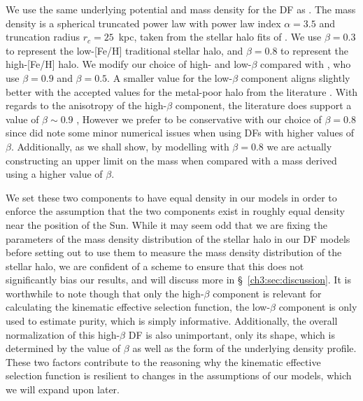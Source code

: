We use the same underlying potential \parencite[\texttt{MWPotential2014 of }][]{bovy15} and mass density for the DF as \cite{lane22}. The mass density is a spherical truncated power law with power law index $\alpha=3.5$ and truncation radius $r_{c} = 25$~kpc, taken from the stellar halo fits of \cite{mackereth20}. We use $\beta=0.3$ to represent the low-[Fe/H] traditional stellar halo, and $\beta=0.8$ to represent the high-[Fe/H] \gse halo. We modify our choice of high- and low-$\beta$ compared with \cite{lane22}, who use $\beta=0.9$ and $\beta=0.5$. A smaller value for the low-$\beta$ component aligns slightly better with the accepted values for the metal-poor halo from the literature \parencite{belokurov18,fattahi19,lancaster19,iorio21}. With regards to the anisotropy of the high-$\beta$ component, the literature does support a value of $\beta \sim 0.9$ \parencite{belokurov18,fattahi19,lancaster19,iorio21}, However we prefer to be conservative with our choice of $\beta=0.8$ since \cite{lane22} did note some minor numerical issues when using DFs with higher values of $\beta$. Additionally, as we shall show, by modelling \gse with $\beta=0.8$ we are actually constructing an upper limit on the mass when compared with a mass derived using a higher value of $\beta$.

 We set these two components to have equal density in our models in order to enforce the assumption that the two components exist in roughly equal density near the position of the Sun. While it may seem odd that we are fixing the parameters of the mass density distribution of the stellar halo in our DF models before setting out to use them to measure the mass density distribution of the stellar halo, we are confident of a scheme to ensure that this does not significantly bias our results, and will discuss more in \S~\ref{ch3:sec:discussion}. It is worthwhile to note though that only the high-$\beta$ component is relevant for calculating the kinematic effective selection function, the low-$\beta$ component is only used to estimate purity, which is simply informative. Additionally, the overall normalization of this high-$\beta$ DF is also unimportant, only its shape, which is determined by the value of $\beta$ as well as the form of the underlying density profile. These two factors contribute to the reasoning why the kinematic effective selection function is resilient to changes in the assumptions of our models, which we will expand upon later.

